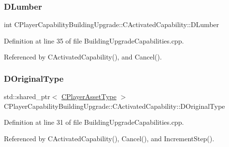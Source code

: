 \subsubsection{\texorpdfstring{D\+Lumber}{DLumber}}
{\footnotesize\ttfamily int C\+Player\+Capability\+Building\+Upgrade\+::\+C\+Activated\+Capability\+::\+D\+Lumber\hspace{0.3cm}{\ttfamily [protected]}}



Definition at line 35 of file Building\+Upgrade\+Capabilities.\+cpp.



Referenced by C\+Activated\+Capability(), and Cancel().

\hypertarget{classCPlayerCapabilityBuildingUpgrade_1_1CActivatedCapability_a9418eb8f3401f341c688f00cf8c4aa53}{}\label{classCPlayerCapabilityBuildingUpgrade_1_1CActivatedCapability_a9418eb8f3401f341c688f00cf8c4aa53} 
\subsubsection{\texorpdfstring{D\+Original\+Type}{DOriginalType}}
{\footnotesize\ttfamily std\+::shared\+\_\+ptr$<$ \hyperlink{classCPlayerAssetType}{C\+Player\+Asset\+Type} $>$ C\+Player\+Capability\+Building\+Upgrade\+::\+C\+Activated\+Capability\+::\+D\+Original\+Type\hspace{0.3cm}{\ttfamily [protected]}}



Definition at line 31 of file Building\+Upgrade\+Capabilities.\+cpp.



Referenced by C\+Activated\+Capability(), Cancel(), and Increment\+Step().

\hypertarget{classCPlayerCapabilityBuildingUpgrade_1_1CActivatedCapability_a9c4ea12cf99701f8ce38e17e03ad0115}{}\label{classCPlayerCapabilityBuildingUpgrade_1_1CActivatedCapability_a9c4ea12cf99701f8ce38e17e03ad0115} 
